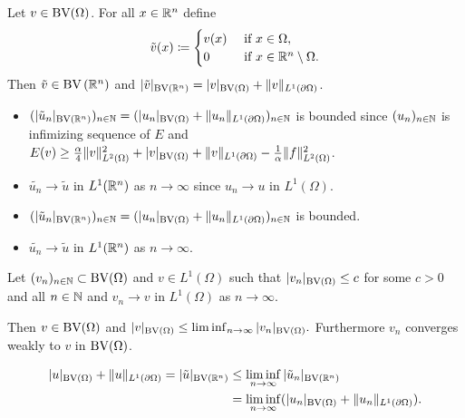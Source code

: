 \begin{frame}

  \begin{block}{}
    Let $v\in\textup{BV}(\Omega)$.
    For all $x\in\mathbb{R}^n$ define
    \begin{align*}
      \tilde{v}(x)\coloneqq
      \begin{cases}
        v(x)  &\text{ if } x\in\Omega,\\
        0     &\text{ if } x\in\mathbb{R}^n\setminus\Omega.
      \end{cases} 
    \end{align*}
    Then $\tilde{v}\in\textup{BV}\left(\mathbb{R}^n\right)$ and
    $|\tilde{v}|_{\textup{BV}\left(\mathbb{R}^n\right)}
    = |v|_{\textup{BV}(\Omega)}+\Vert v\Vert_{L^1(\partial\Omega)}$.
  \end{block}

  \pause 
  \begin{itemize}[label=$\bullet$]
    \item 
      $(|\tilde{u}_n|_{\textup{BV}(\mathbb{R}^n)})_{n\in\mathbb{N}} = (|u_n|_{\textup{BV}(\Omega)}+\Vert
      u_n\Vert_{L^1(\partial\Omega)})_{n\in\mathbb{N}}$ is bounded since 
      $(u_n)_{n\in\mathbb{N}}$ is infimizing sequence of $E$ and
      $E(v)\geq 
      \frac{\alpha}{4}\Vert v\Vert_{L^2(\Omega)}^2 + |v|_{\textup{BV}(\Omega)}
      +\Vert v\Vert_{L^1(\partial\Omega)}-\frac{1}{\alpha}\Vert
      f\Vert_{L^2(\Omega)}^2$.
      \pause
    \item $\tilde{u_n}\to\tilde{u}$ in $L^1(\mathbb{R}^n)$ as $n\to\infty$ since
      $u_n\to u$ in $L^1(\Omega)$.
  \end{itemize}
\end{frame}

\begin{frame}
  \begin{itemize}[label=$\bullet$]
    \item 
      $(|\tilde{u}_n|_{\textup{BV}(\mathbb{R}^n)})_{n\in\mathbb{N}} = (|u_n|_{\textup{BV}(\Omega)}+\Vert
      u_n\Vert_{L^1(\partial\Omega)})_{n\in\mathbb{N}}$ is bounded.
      \pause
    \item $\tilde{u_n}\to\tilde{u}$ in $L^1(\mathbb{R}^n)$ as $n\to\infty$.
  \end{itemize}
  \pause
  \begin{block}{}
    Let $(v_n)_{n\in\mathbb{N}}\subset\textup{BV}(\Omega)$ and $v\in L^1(\Omega)$ such that
    $|v_n|_{\textup{BV}(\Omega)}\leq c$ for some $c>0$ and all $n\in\mathbb{N}$ and
    $v_n\rightarrow v$ in $L^1(\Omega)$ as $n\rightarrow\infty$.

    Then $v\in\textup{BV}(\Omega)$ and $|v|_{\textup{BV}(\Omega)}\leq
    \liminf_{n\rightarrow\infty}|v_n|_{\textup{BV}(\Omega)}.$
    Furthermore $v_n$ converges weakly to $v$ in $\textup{BV}(\Omega)$.
  \end{block}
  \pause
  \begin{align*}
    |u|_{\textup{BV}(\Omega)} +\Vert u\Vert_{L^1(\partial\Omega)}
    = |\tilde{u}|_{\textup{BV}(\mathbb{R}^n)}
    &\leq\liminf_{n\to\infty} |\tilde{u}_n|_{\textup{BV}(\mathbb{R}^n)}\\
    &= \liminf_{n\to\infty} (|u_n|_{\textup{BV}(\Omega)} +
    \Vert u_n\Vert_{L^1(\partial\Omega)}).
  \end{align*}
\end{frame}

